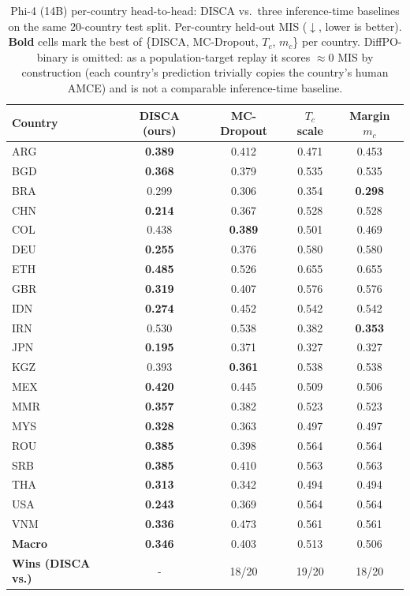 \documentclass{article}
\begin{document}
\begin{table}[H]\centering\scriptsize
\caption{Phi-4 (14B) per-country head-to-head: DISCA vs.\ three
inference-time baselines on the same 20-country test split. Per-country held-out MIS ($\downarrow$, lower is better). \textbf{Bold} cells mark the best of \{DISCA, MC-Dropout, $T_c$, $m_c$\} per country. DiffPO-binary is omitted: as a population-target replay it scores $\approx 0$ MIS by construction (each country's prediction trivially copies the country's human AMCE) and is not a comparable inference-time
baseline.}
\label{tab:r2_baselines_filled}
\setlength{\tabcolsep}{6pt}
\begin{tabular}{lcccc}\toprule
Country & DISCA (ours) & MC-Dropout & $T_c$ scale & Margin $m_c$ \\\midrule
ARG & \textbf{0.389} & 0.412 & 0.471 & 0.453 \\
BGD & \textbf{0.368} & 0.379 & 0.535 & 0.535 \\
BRA & 0.299 & 0.306 & 0.354 & \textbf{0.298} \\
CHN & \textbf{0.214} & 0.367 & 0.528 & 0.528 \\
COL & 0.438 & \textbf{0.389} & 0.501 & 0.469 \\
DEU & \textbf{0.255} & 0.376 & 0.580 & 0.580 \\
ETH & \textbf{0.485} & 0.526 & 0.655 & 0.655 \\
GBR & \textbf{0.319} & 0.407 & 0.576 & 0.576 \\
IDN & \textbf{0.274} & 0.452 & 0.542 & 0.542 \\
IRN & 0.530 & 0.538 & 0.382 & \textbf{0.353} \\
JPN & \textbf{0.195} & 0.371 & 0.327 & 0.327 \\
KGZ & 0.393 & \textbf{0.361} & 0.538 & 0.538 \\
MEX & \textbf{0.420} & 0.445 & 0.509 & 0.506 \\
MMR & \textbf{0.357} & 0.382 & 0.523 & 0.523 \\
MYS & \textbf{0.328} & 0.363 & 0.497 & 0.497 \\
ROU & \textbf{0.385} & 0.398 & 0.564 & 0.564 \\
SRB & \textbf{0.385} & 0.410 & 0.563 & 0.563 \\
THA & \textbf{0.313} & 0.342 & 0.494 & 0.494 \\
USA & \textbf{0.243} & 0.369 & 0.564 & 0.564 \\
VNM & \textbf{0.336} & 0.473 & 0.561 & 0.561 \\\midrule
\textbf{Macro} & \textbf{0.346} & 0.403 & 0.513 & 0.506 \\
\textbf{Wins (DISCA vs.)} & - & 18/20 & 19/20 & 18/20 \\
\bottomrule
\end{tabular}
\end{table}
\end{document}
